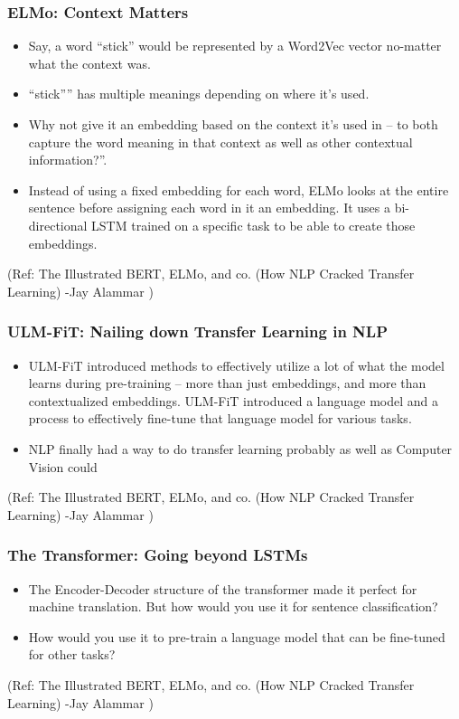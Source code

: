 \begin{frame}[fragile]\frametitle{ELMo: Context Matters}
\begin{itemize}
\item  Say, a word “stick” would be represented by a Word2Vec vector no-matter what the context was. 
\item  “stick”” has multiple meanings depending on where it’s used. 
\item Why not give it an embedding based on the context it’s used in – to both capture the word meaning in that context as well as other contextual information?”. 
\item Instead of using a fixed embedding for each word, ELMo looks at the entire sentence before assigning each word in it an embedding. It uses a bi-directional LSTM trained on a specific task to be able to create those embeddings.

\end{itemize}


{\tiny (Ref: The Illustrated BERT, ELMo, and co. (How NLP Cracked Transfer Learning) -Jay Alammar )}
\end{frame}

\begin{frame}[fragile]\frametitle{ULM-FiT: Nailing down Transfer Learning in NLP}
\begin{itemize}
\item  ULM-FiT introduced methods to effectively utilize a lot of what the model learns during pre-training – more than just embeddings, and more than contextualized embeddings. ULM-FiT introduced a language model and a process to effectively fine-tune that language model for various tasks.
\item NLP finally had a way to do transfer learning probably as well as Computer Vision could
\end{itemize}


{\tiny (Ref: The Illustrated BERT, ELMo, and co. (How NLP Cracked Transfer Learning) -Jay Alammar )}
\end{frame}

\begin{frame}[fragile]\frametitle{The Transformer: Going beyond LSTMs}
\begin{itemize}
\item The Encoder-Decoder structure of the transformer made it perfect for machine translation. But how would you use it for sentence classification? 
\item How would you use it to pre-train a language model that can be fine-tuned for other tasks?
\end{itemize}


{\tiny (Ref: The Illustrated BERT, ELMo, and co. (How NLP Cracked Transfer Learning) -Jay Alammar )}
\end{frame}

